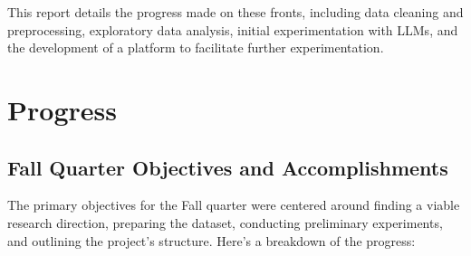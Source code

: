 \documentclass[12pt, letterpaper]{article}
\begin{document}
This report details the progress made on these fronts, including data cleaning and preprocessing, exploratory data analysis, initial experimentation with LLMs, and the development of a platform to facilitate further experimentation.

\section{Progress}

\subsection{Fall Quarter Objectives and Accomplishments}

The primary objectives for the Fall quarter were centered around finding a viable research direction, preparing the dataset, conducting preliminary experiments, and outlining the project's structure. Here's a breakdown of the progress:
\end{document}
